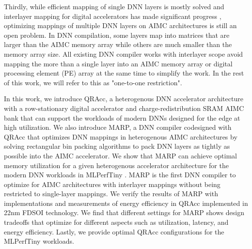 Thirdly, while efficient mapping of single DNN layers is mostly solved \cite{mei2021zigzag} and interlayer mapping for digital accelerators has made significant progress \cite{mei2023defines}, optimizing mappings of multiple DNN layers on AIMC architectures is still an open problem. In DNN compilation, some layers map into matrices that are larger than the AIMC memory array while others are much smaller than the memory array size. All existing DNN compiler works with interlayer scope avoid mapping the more than a single layer into an AIMC memory array or digital processing element (PE) array at the same time to simplify the work. In the rest of this work, we will refer to this as "one-to-one restriction". 


In this work, we introduce QRAcc, a heterogenous DNN accelerator architecture with a row-stationary digital accelerator and charge-redistribution SRAM AIMC bank that can support the workloads of modern DNNs designed for the edge at high utilization. We also introduce MARP, a DNN compiler codesigned with QRAcc that optimizes DNN mappings in heterogenous AIMC architectures by solving rectangular bin packing algorithms to pack DNN layers as tightly as possible into the AIMC accelerator. We show that MARP can achieve optimal memory utilization for a given heterogenous accelerator architecture for the modern DNN workloads in MLPerfTiny \cite{}. MARP is the first DNN compiler to optimize for AIMC architectures with interlayer mappings without being restricted to single-layer mappings. We verify the results of MARP with implementations and measurements of energy efficiency in QRAcc implemented in 22nm FDSOI technology. We find that different settings for MARP shows design tradeoffs that optimize for different aspects such as utilization, latency, and energy efficiency. Lastly, we provide optimal QRAcc configurations for the MLPerfTiny workloads. 
